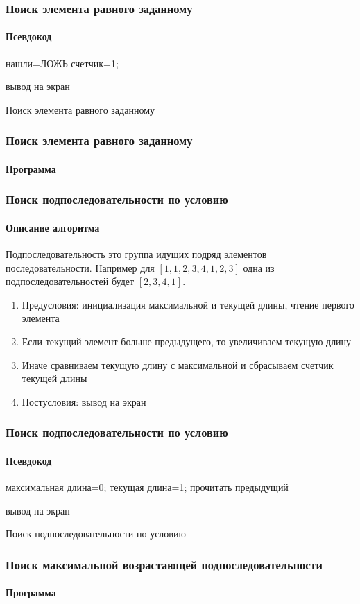\begin{frame}[fragile]
\frametitle{Поиск элемента равного заданному}
\framesubtitle{Псевдокод}
\small
\begin{algorithm}[H]
		\SetAlgoLined
		нашли=ЛОЖЬ\;
		счетчик=1;
	
	вывод на экран\;
	\caption{Поиск элемента равного заданному}
\end{algorithm}


\end{frame}


\begin{frame}[fragile]
\frametitle{Поиск элемента равного заданному}
\framesubtitle{Программа}
\small{

}
\end{frame}

\begin{frame}[fragile]
\frametitle{Поиск подпоследовательности по условию}
\framesubtitle{Описание алгоритма}
Подпоследовательность это группа идущих подряд элементов последовательности. Например для $[1,1,2,3,4,1,2,3]$ одна из подпоследовательностей будет $[2,3,4,1]$.
\begin{enumerate}
	\item Предусловия: инициализация максимальной и текущей длины, чтение первого элемента
	\item Если текущий элемент больше предыдущего, то увеличиваем текущую длину
	\item Иначе сравниваем текущую длину с максимальной и сбрасываем счетчик текущей длины
	\item Постусловия: вывод на экран
\end{enumerate}

\end{frame}

\begin{frame}[fragile]
\frametitle{Поиск подпоследовательности по условию}
\framesubtitle{Псевдокод}
\small
\begin{algorithm}[H]
		\SetAlgoLined
		максимальная длина=0;
		текущая длина=1;
		прочитать предыдущий\;
	
	вывод на экран\;
	\caption{Поиск подпоследовательности по условию}
\end{algorithm}


\end{frame}


\begin{frame}[fragile]
\frametitle{Поиск максимальной возрастающей подпоследовательности}
\framesubtitle{Программа}
\small{

}
\end{frame}